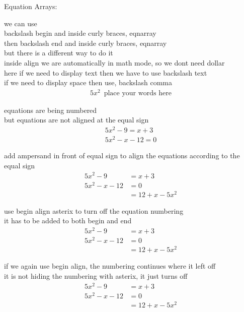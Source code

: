 \documentclass[24pt]{article}
\begin{document}
\vspace{2cm}

Equation Arrays:\\

\vspace{1cm}

we can use \\
backslash begin and inside curly braces, eqnarray\\
then backslash end and inside curly braces, eqnarray\\

but there is a different way to do it\\
inside align we are automatically in math mode, so we dont need dollar\\
here if we need to display text then we have to use backslash text\\
if we need to display space then use, backslash comma\\
\begin{align}
5x^2\, \text{ place your words here}
\end{align}

\vspace{1cm}

equations are being numbered\\
but equations are not aligned at the equal sign\\
\begin{align}
5x^2-9=x+3\\
5x^2-x-12=0
\end{align}

\vspace{1cm}

add ampersand in front of equal sign to align the equations according to the equal sign\\
\begin{align}
5x^2-9&=x+3\\
5x^2-x-12&=0\\
&=12+x-5x^2
\end{align}


\vspace{1cm}

use begin align asterix to turn off the equation numbering\\
it has to be added to both begin and end\\
\begin{align*}
5x^2-9&=x+3\\
5x^2-x-12&=0\\
&=12+x-5x^2
\end{align*}

\vspace{1cm}

if we again use begin align, the numbering continues where it left off\\
it is not hiding the numbering with asterix, it just turns off\\
\begin{align}
5x^2-9&=x+3\\
5x^2-x-12&=0\\
&=12+x-5x^2
\end{align}
\end{document}
